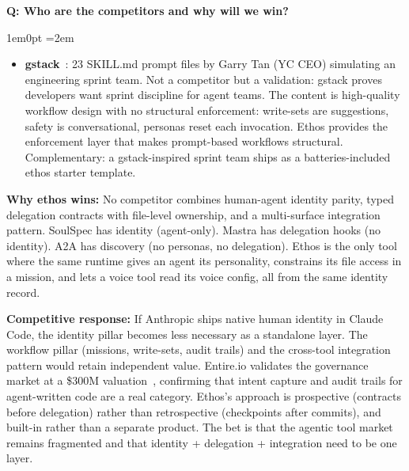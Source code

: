 \documentclass[11pt,letterpaper]{article}
\newcounter{faqnum}
\newenvironment{faqpair}[1]{%
  \needspace{4\baselineskip}%
  \vspace{0.5em}%
  \refstepcounter{faqnum}%
  \noindent\textbf{\color{SectionBlue}Q\thefaqnum: #1}\par\nopagebreak[4]%
  \vspace{0.2em}%
  \begin{adjustwidth}{1em}{0pt}%
  \setlength{\parindent}{0pt}%
  \emergencystretch=2em%
}{%
  \end{adjustwidth}%
  \vspace{0.5em}%
}
\begin{document}
\begin{faqpair}{Who are the competitors and why will we win?}
\begin{itemize}[nosep]
  \item \textbf{gstack}~\cite{gstack2025github}: 23 SKILL.md prompt files by Garry Tan (YC CEO) simulating an engineering sprint team. Not a competitor but a validation: gstack proves developers want sprint discipline for agent teams. The content is high-quality workflow design with no structural enforcement: write-sets are suggestions, safety is conversational, personas reset each invocation. Ethos provides the enforcement layer that makes prompt-based workflows structural. Complementary: a gstack-inspired sprint team ships as a batteries-included ethos starter template.
\end{itemize}

\textbf{Why ethos wins:} No competitor combines human-agent identity parity, typed delegation contracts with file-level ownership, and a multi-surface integration pattern. SoulSpec has identity (agent-only). Mastra has delegation hooks (no identity). A2A has discovery (no personas, no delegation). Ethos is the only tool where the same runtime gives an agent its personality, constrains its file access in a mission, and lets a voice tool read its voice config, all from the same identity record.

\textbf{Competitive response:} If Anthropic ships native human identity in Claude Code, the identity pillar becomes less necessary as a standalone layer. The workflow pillar (missions, write-sets, audit trails) and the cross-tool integration pattern would retain independent value. Entire.io validates the governance market at a \$300M valuation~\cite{entire2026techcrunch}, confirming that intent capture and audit trails for agent-written code are a real category. Ethos's approach is prospective (contracts before delegation) rather than retrospective (checkpoints after commits), and built-in rather than a separate product. The bet is that the agentic tool market remains fragmented and that identity + delegation + integration need to be one layer.
\end{faqpair}
\end{document}
